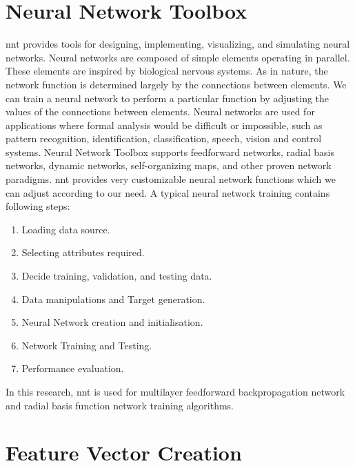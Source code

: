 \section{Neural Network Toolbox}
\ac{nnt} provides tools for designing, implementing, visualizing, and simulating neural networks. Neural networks are composed of simple elements operating in parallel. These elements are inspired by biological nervous systems. As in nature, the network function is determined largely by the connections between elements. We can train a neural network to perform a particular function by adjusting the values of the connections between elements. Neural networks are used for applications where formal analysis would be difficult or impossible, such as pattern recognition, identification, classification, speech, vision and control systems. Neural Network Toolbox supports feedforward networks, radial basis networks, dynamic networks, self-organizing maps, and other proven network paradigms. \ac{nnt} provides very customizable neural network functions which we can adjust according to our need. A typical neural network training contains following steps:
\begin{enumerate}
\itemsep0em 
\item Loading data source.
\item Selecting attributes required.
\item Decide training, validation, and testing data.
\item Data manipulations and Target generation.
\item Neural Network creation and initialisation.
\item Network Training and Testing.
\item Performance evaluation.
\end{enumerate}
In this research, \ac{nnt} is used for multilayer feedforward backpropagation network and radial basis function network training algorithms.

\section{Feature Vector Creation} \label{section_feature_vector_creation}


